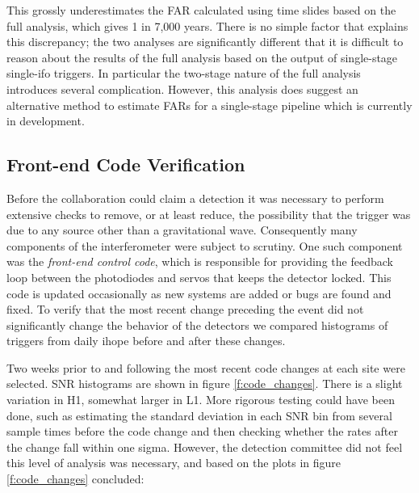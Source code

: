 This grossly underestimates the FAR calculated using time slides based
on the full analysis, which gives 1 in 7,000 years.  There is no
simple factor that explains this discrepancy; the two analyses are
significantly different that it is difficult to reason about the
results of the full analysis based on the output of single-stage
single-ifo triggers.  In particular the two-stage nature of the full
analysis introduces several complication.  However, this analysis does
suggest an alternative method to estimate FARs for a single-stage
pipeline which is currently in development.
\fi


\subsection{Front-end Code Verification}


Before the collaboration could claim a detection it was necessary to
perform extensive checks to remove, or at least reduce, the
possibility that the trigger was due to any source other than a
gravitational wave.  Consequently many components of the
interferometer were subject to scrutiny.  One such component was the
\emph{front-end control code}, which is responsible for providing the
feedback loop between the photodiodes and servos that keeps the
detector locked.  This code is updated occasionally as new systems are
added or bugs are found and fixed.   To verify that the most recent
change preceding the event did not significantly change the behavior
of the detectors we compared histograms of triggers from daily ihope
before and after these changes.

Two weeks prior to and following the most recent code changes at each
site were selected.  SNR histograms are shown in figure
\ref{f:code_changes}.  There is a slight variation in H1, somewhat
larger in L1.  More rigorous testing could have been done, such as
estimating the standard deviation in each SNR bin from several sample
times before the code change and then checking whether the rates after
the change fall within one sigma.  However, the detection committee
did not feel this level of analysis was necessary, and based on the
plots in figure \ref{f:code_changes} concluded:

